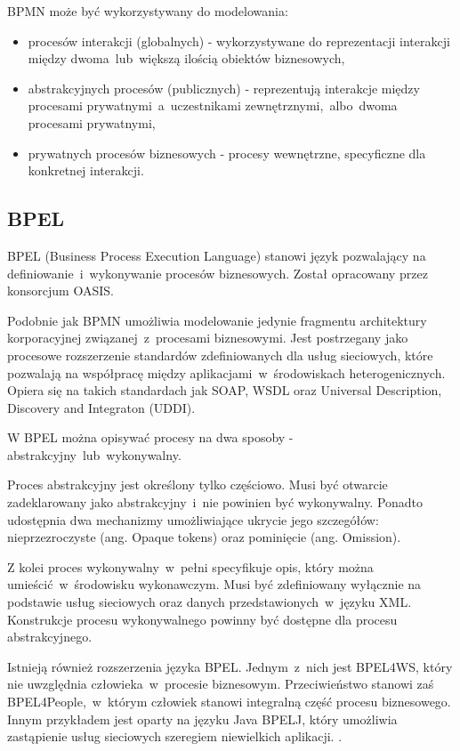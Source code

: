 BPMN może być wykorzystywany do modelowania:
\begin{itemize}
\item{procesów interakcji (globalnych) - wykorzystywane do reprezentacji interakcji między dwoma~lub~większą ilością obiektów biznesowych,}
\item{abstrakcyjnych procesów (publicznych) - reprezentują interakcje między procesami prywatnymi~a~uczestnikami zewnętrznymi,~albo~dwoma procesami prywatnymi,}
\item{prywatnych procesów biznesowych - procesy wewnętrzne, specyficzne dla konkretnej interakcji.}
\end{itemize}

\subsection{BPEL}
BPEL (Business Process Execution Language) stanowi język pozwalający na definiowanie~i~wykonywanie procesów biznesowych. Został opracowany przez konsorcjum OASIS.

Podobnie jak BPMN umożliwia modelowanie jedynie fragmentu architektury korporacyjnej związanej~z~procesami biznesowymi. Jest postrzegany jako procesowe rozszerzenie standardów zdefiniowanych dla usług sieciowych, które pozwalają na współpracę między aplikacjami~w~środowiskach heterogenicznych. Opiera się na takich standardach jak SOAP, WSDL oraz Universal Description, Discovery and Integraton (UDDI). 

W BPEL można opisywać procesy na dwa sposoby - abstrakcyjny~lub~wykonywalny.

Proces abstrakcyjny jest określony tylko częściowo. Musi być otwarcie zadeklarowany jako abstrakcyjny~i~nie powinien być wykonywalny. Ponadto  udostępnia dwa mechanizmy umożliwiające ukrycie jego szczegółów: nieprzezroczyste (ang. Opaque tokens) oraz pominięcie (ang. Omission).

Z kolei proces wykonywalny~w~pełni specyfikuje opis, który można umieścić~w~środowisku wykonawczym. Musi być zdefiniowany wyłącznie na podstawie usług sieciowych oraz danych przedstawionych~w~języku XML. Konstrukcje procesu wykonywalnego powinny być dostępne dla procesu abstrakcyjnego. 

Istnieją również rozszerzenia języka BPEL. Jednym~z~nich jest BPEL4WS, który nie uwzględnia człowieka~w~procesie biznesowym. Przeciwieństwo stanowi zaś BPEL4People,~w~którym człowiek stanowi integralną część procesu biznesowego. Innym przykładem jest oparty na języku Java BPELJ, który umożliwia zastąpienie usług sieciowych szeregiem niewielkich aplikacji. \cite{PlatIntGor}. 

